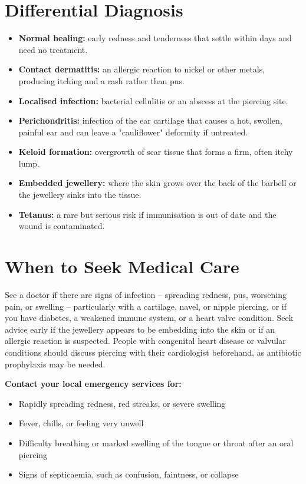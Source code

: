 \section*{Differential Diagnosis}
\begin{itemize}
    \item \textbf{Normal healing:} early redness and tenderness that settle within days and need no treatment.
    \item \textbf{Contact dermatitis:} an allergic reaction to nickel or other metals, producing itching and a rash rather than pus.
    \item \textbf{Localised infection:} bacterial cellulitis or an abscess at the piercing site.
    \item \textbf{Perichondritis:} infection of the ear cartilage that causes a hot, swollen, painful ear and can leave a "cauliflower" deformity if untreated.
    \item \textbf{Keloid formation:} overgrowth of scar tissue that forms a firm, often itchy lump.
    \item \textbf{Embedded jewellery:} where the skin grows over the back of the barbell or the jewellery sinks into the tissue.
    \item \textbf{Tetanus:} a rare but serious risk if immunisation is out of date and the wound is contaminated.
\end{itemize}

\section*{When to Seek Medical Care}
See a doctor if there are signs of infection -- spreading redness, pus, worsening pain, or swelling -- particularly with a cartilage, navel, or nipple piercing, or if you have diabetes, a weakened immune system, or a heart valve condition. Seek advice early if the jewellery appears to be embedding into the skin or if an allergic reaction is suspected. People with congenital heart disease or valvular conditions should discuss piercing with their cardiologist beforehand, as antibiotic prophylaxis may be needed.

\textbf{Contact your local emergency services for:}
\begin{itemize}
    \item Rapidly spreading redness, red streaks, or severe swelling
    \item Fever, chills, or feeling very unwell
    \item Difficulty breathing or marked swelling of the tongue or throat after an oral piercing
    \item Signs of septicaemia, such as confusion, faintness, or collapse
\end{itemize}

